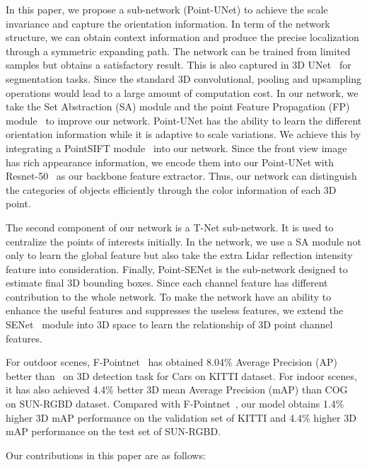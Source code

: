 \documentclass[letterpaper]{article} %
\begin{document}
In this paper, we propose a sub-network (Point-UNet) to achieve the scale invariance and capture the orientation information. In term of the network structure, we can obtain context information and produce the precise localization through a symmetric expanding path. The network can be trained from limited samples but obtains a satisfactory result. This is also captured in 3D UNet~\cite{cciccek20163d} for segmentation tasks. Since the standard 3D convolutional, pooling and upsampling operations would lead to a large amount of computation cost. In our network, we take the Set Abstraction (SA) module and the point Feature Propagation (FP) module~\cite{qi2017pointnet++} to improve our network. Point-UNet has the ability to learn the different orientation information while it is adaptive to scale variations. We achieve this by integrating a PointSIFT module~\cite{jiang2018pointsift} into our network. Since the front view image has rich appearance information, we encode them into our Point-UNet with Resnet-50~\cite{he2016deep} as our backbone feature extractor. Thus, our network can distinguish the categories of objects efficiently through the color information of each 3D point.
  
The second component of our network is a T-Net sub-network. It is used to centralize the points of interests initially. In the network, we use a SA module not only to learn the global feature but also take the extra Lidar reflection intensity feature into consideration. Finally, Point-SENet is the sub-network designed to estimate final 3D bounding boxes. Since each channel feature has different contribution to the whole network. To make the network have an ability to enhance the useful features and suppresses the useless features, we extend the SENet~\cite{hu2017squeeze} module into 3D space to learn the relationship of 3D point channel features.

For outdoor scenes, F-Pointnet~\cite{qi2017frustum} has obtained 8.04\% Average Precision (AP) better than~\cite{chen2017multi} on 3D detection task for Cars on KITTI dataset. For indoor scenes, it has also achieved 4.4\% better 3D mean Average Precision (mAP) than COG~\cite{ren2016three} on SUN-RGBD dataset. Compared with F-Pointnet~\cite{qi2017frustum}, our model obtains 1.4\% higher 3D mAP performance on the validation set of KITTI and 4.4\% higher 3D mAP performance on the test set of SUN-RGBD.

Our contributions in this paper are as follows:
\end{document}
